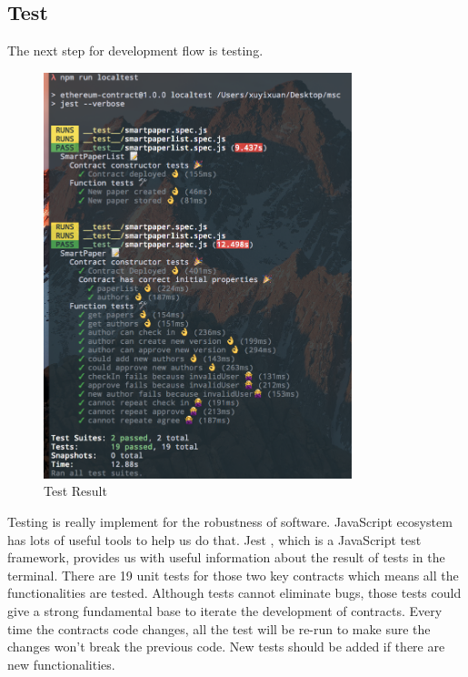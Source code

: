 \documentclass[openany,12pt]{ecsthesis}      %
\begin{document}
\subsection{Test}
The next step for development flow is testing.
\begin{figure}[H]
  \centering
  \includegraphics[width=0.8\textwidth]{test.png}
  \caption{Test Result}
  \label{test} 
\end{figure}
Testing is really implement for the robustness of software. 
JavaScript ecosystem has lots of useful tools to help us do that.
Jest \cite{jest}, which is a JavaScript test framework, 
provides us with useful information about the result of tests in the terminal.
There are 19 unit tests for those two key contracts which means all the functionalities are tested. Although tests cannot eliminate bugs,
those tests could give a strong fundamental base to iterate the development of contracts. Every time the contracts code changes, 
all the test will be re-run to make sure the changes won't break the previous code. 
New tests should be added if there are new functionalities.
\end{document}
